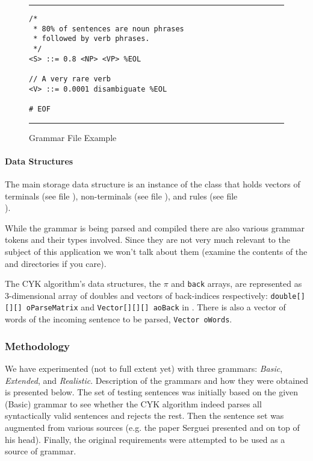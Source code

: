 \begin{figure}
\hrule\vskip4pt
\begin{verbatim}
/*
 * 80% of sentences are noun phrases
 * followed by verb phrases.
 */
<S> ::= 0.8 <NP> <VP> %EOL

// A very rare verb
<V> ::= 0.0001 disambiguate %EOL

# EOF
\end{verbatim}
\caption{Grammar File Example}
\label{fig:grammar-example}
\vskip4pt\hrule
\end{figure}


\paragraph{Data Structures}

The main storage data structure is an instance of the  class that holds
vectors of
terminals (see file ),
non-terminals (see file ),
and rules (see file \\).

While the grammar is being parsed and compiled there are also
various grammar tokens and their types involved.
Since they are
not very much relevant to the subject of this application we won't talk about them
(examine the contents of the  and 
directories if you care).

The CYK algorithm's data structures, the $\pi$ and \verb+back+ arrays,
are represented as 3-dimensional array of doubles and vectors of back-indices
respectively: \verb+double[][][] oParseMatrix+ and \verb+Vector[][][] aoBack+
in . There is also a vector of
words of the incoming sentence to be parsed, \verb+Vector oWords+.



\subsubsection{Methodology}

We have experimented (not to full extent yet) with three grammars:
{\em Basic}, {\em Extended}, and {\em Realistic}. Description of the grammars and how
they were obtained is presented below. The set of testing sentences was initially
based on the given (Basic) grammar to see whether the CYK algorithm indeed
parses all syntactically valid sentences and rejects the rest. Then the
sentence set was augmented from various sources (e.g. the paper Serguei presented
and on top of his head). Finally, the original requirements were attempted to be used
as a source of grammar.

